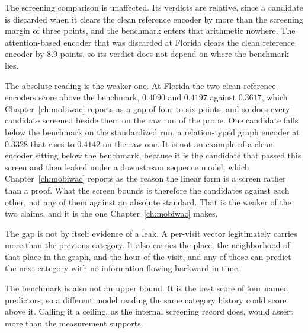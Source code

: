 The screening comparison is unaffected. Its verdicts are relative, since a candidate is discarded
when it clears the clean reference encoder by more than the screening margin of three points, and
the benchmark enters that arithmetic nowhere. The attention-based encoder that was discarded at
Florida clears the clean reference encoder by $8.9$ points, so its verdict does not depend on where
the benchmark lies.

The absolute reading is the weaker one. At Florida the two clean reference encoders score above
the benchmark, $0.4090$ and $0.4197$ against $0.3617$, which Chapter~\ref{ch:mobiwac} reports as a
gap of four to six points, and so does every candidate screened beside them on the raw run of the
probe. One candidate falls below the benchmark on the standardized run, a relation-typed graph
encoder at $0.3328$ that rises to $0.4142$ on the raw one. It is not an example of a clean encoder
sitting below the benchmark, because it is the candidate that passed this screen and then leaked
under a downstream sequence model, which Chapter~\ref{ch:mobiwac} reports as the reason the linear
form is a screen rather than a proof. What the screen bounds is therefore the candidates against
each other, not any of them against an absolute standard. That is the weaker of the two claims, and
it is the one Chapter~\ref{ch:mobiwac} makes.

The gap is not by itself evidence of a leak. A per-visit vector legitimately carries more than the
previous category. It also carries the place, the neighborhood of that place in the graph, and the
hour of the visit, and any of those can predict the next category with no information flowing
backward in time.

The benchmark is also not an upper bound. It is the best score of four named predictors, so a
different model reading the same category history could score above it. Calling it a ceiling, as
the internal screening record does, would assert more than the measurement supports.

